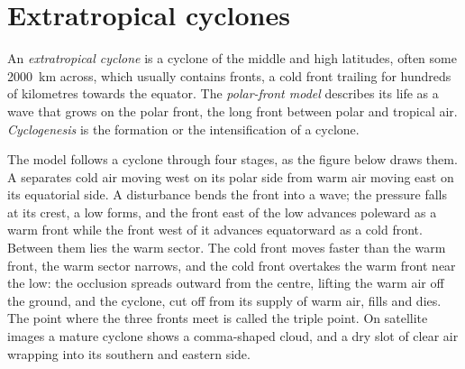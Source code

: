 \section{Extratropical cyclones}\label{sec:b2:weather-systems:cyclones}

\begin{definition}\label{def:b2:weather-systems:cyclones}
An \emph{extratropical cyclone} is a cyclone of the middle and high
latitudes, often some \qty{2000}{km} across, which usually contains fronts, a cold front trailing
for hundreds of kilometres towards the equator. The \emph{polar-front model}
describes its life as a wave that grows on the polar front, the long front between polar
and tropical air. \emph{Cyclogenesis} is the formation or the intensification
of a cyclone.
\end{definition}

The model follows a cyclone through four stages, as the figure below draws them. A  separates cold air moving west on its polar side from warm air moving east on its
equatorial side. A disturbance bends the front into a wave; the pressure falls at its crest, a
low forms, and the front east of the low advances poleward as a warm front while the front west
of it advances equatorward as a cold front. Between them lies the warm sector. The cold front
moves faster than the warm front, the warm sector narrows, and the cold front overtakes the warm
front near the low: the occlusion spreads outward from the centre, lifting the warm air off the
ground, and the cyclone, cut off from its supply of warm air, fills and dies. The point where the
three fronts meet is called the triple point. On satellite images a mature cyclone shows a
comma-shaped cloud, and a dry slot of clear air wrapping into its southern and eastern side.


